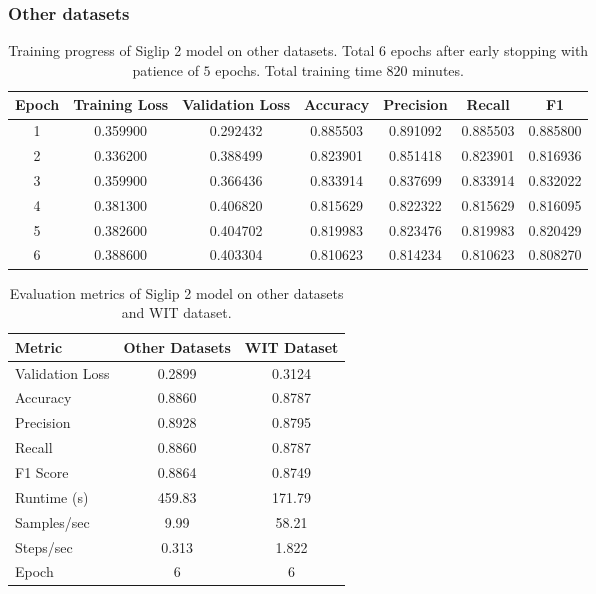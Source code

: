 \documentclass[a4paper]{article}
\begin{document}
\subsubsection{Other datasets}

\begin{table}[H]
    \centering
    \caption{Training progress of Siglip 2 model on other datasets. Total $6$ epochs after early stopping with patience of $5$ epochs. Total training time $820$ minutes.}
    \label{tab:siglip_training_progress}
    \begin{tabular}{ccccccc}
        \toprule
        \textbf{Epoch} & \textbf{Training Loss} & \textbf{Validation Loss} & \textbf{Accuracy} & \textbf{Precision} & \textbf{Recall} & \textbf{F1} \\
        \midrule
        1 & 0.359900 & 0.292432 & 0.885503 & 0.891092 & 0.885503 & 0.885800 \\
        2 & 0.336200 & 0.388499 & 0.823901 & 0.851418 & 0.823901 & 0.816936 \\
        3 & 0.359900 & 0.366436 & 0.833914 & 0.837699 & 0.833914 & 0.832022 \\
        4 & 0.381300 & 0.406820 & 0.815629 & 0.822322 & 0.815629 & 0.816095 \\
        5 & 0.382600 & 0.404702 & 0.819983 & 0.823476 & 0.819983 & 0.820429 \\
        6 & 0.388600 & 0.403304 & 0.810623 & 0.814234 & 0.810623 & 0.808270 \\
        \bottomrule
    \end{tabular}
\end{table}

\begin{table}[H]
    \centering
    \caption{Evaluation metrics of Siglip 2 model on other datasets and WIT dataset.}
    \label{tab:siglip_eval}
    \begin{tabular}{lcc}
        \toprule
        \textbf{Metric} & \textbf{Other Datasets} & \textbf{WIT Dataset} \\
        \midrule
        Validation Loss      & 0.2899   & 0.3124 \\
        Accuracy             & 0.8860   & 0.8787 \\
        Precision            & 0.8928   & 0.8795 \\
        Recall               & 0.8860   & 0.8787 \\
        F1 Score             & 0.8864   & 0.8749 \\
        Runtime (s)          & 459.83   & 171.79 \\
        Samples/sec          & 9.99     & 58.21 \\
        Steps/sec            & 0.313    & 1.822 \\
        Epoch                & 6        & 6 \\
        \bottomrule
    \end{tabular}
\end{table}
\end{document}
